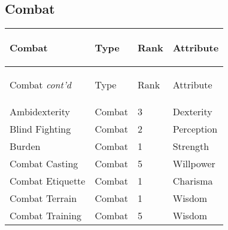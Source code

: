 \documentclass[twoside]{book}
\begin{document}
    

\subsection{Combat}
    
\begin{longtable}{p{1.25in}lll} 
  Combat
  &
  \begin{turn}{70}{Type}\end{turn}
          
  &
  \begin{turn}{70}{Rank}\end{turn}
          
  &
  \begin{turn}{70}{Attribute}\end{turn}
          
  \\
  \hline
  \hline
  \endfirsthead
  Combat \textit{cont'd}
        
  &
  \begin{turn}{70}{Type}\end{turn}
          
  &
  \begin{turn}{70}{Rank}\end{turn}
          
  &
  \begin{turn}{70}{Attribute}\end{turn}
          
  \\
  \hline
  \endhead
      
  \raggedright
           Ambidexterity 
  &
   Combat 
  &
   3 
  &
   Dexterity 
  \tabularnewline
      
  \raggedright
           Blind Fighting 
  &
   Combat 
  &
   2 
  &
   Perception 
  \tabularnewline
      
  \raggedright
           Burden 
  &
   Combat 
  &
   1 
  &
   Strength 
  \tabularnewline
      
  \raggedright
           Combat Casting 
  &
   Combat 
  &
   5 
  &
   Willpower 
  \tabularnewline
      
  \raggedright
           Combat Etiquette 
  &
   Combat 
  &
   1 
  &
   Charisma 
  \tabularnewline
      
  \raggedright
           Combat Terrain 
  &
   Combat 
  &
   1 
  &
   Wisdom 
  \tabularnewline
      
  \raggedright
           Combat Training 
  &
   Combat 
  &
   5 
  &
   Wisdom 
  \tabularnewline
      

\end{longtable}
\end{document}
